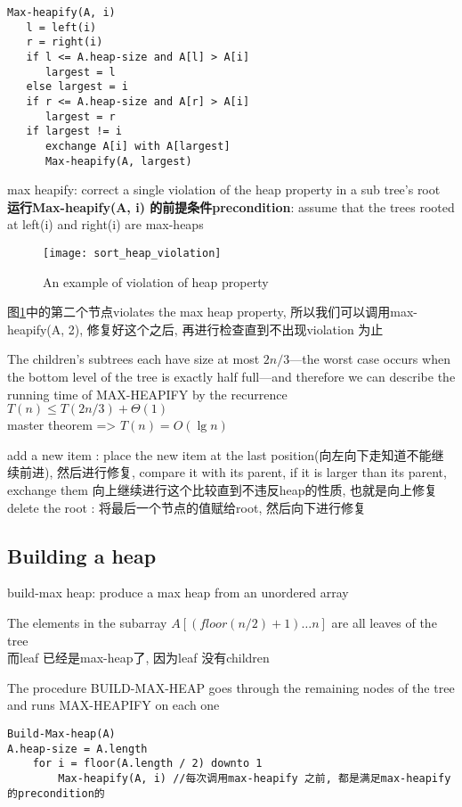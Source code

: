 \documentclass{article}
\begin{document}
\begin{verbatim}
Max-heapify(A, i)
   l = left(i)
   r = right(i)
   if l <= A.heap-size and A[l] > A[i]
      largest = l
   else largest = i
   if r <= A.heap-size and A[r] > A[i]
      largest = r
   if largest != i
      exchange A[i] with A[largest]
      Max-heapify(A, largest)
\end{verbatim}

max heapify: correct a single violation of the heap property in a sub tree's root\\
\textbf{运行Max-heapify(A, i) 的前提条件precondition}: assume that the trees rooted at left(i) and right(i) are max-heaps

\begin{figure}[htbp]
  \centering
  \texttt{[image: sort\_heap\_violation]}
  \caption{An example of violation of heap property}\label{fig.sort.heap.violation}
\end{figure}
图\ref{fig.sort.heap.violation}中的第二个节点violates the max heap property, 所以我们可以调用max-heapify(A, 2), 修复好这个之后, 再进行检查直到不出现violation 为止

The children's subtrees each have size at most $2n/3$—the worst case occurs when the bottom level of the tree is exactly half full—and therefore we can describe the running time of MAX-HEAPIFY by the recurrence\\
$T(n) \leq T(2n/3) +\Theta(1)$\\
master theorem => $T(n) = O(\lg n)$

add a new item : place the new item at the last position(向左向下走知道不能继续前进), 然后进行修复, compare it with its parent, if it is larger than its parent, exchange them 向上继续进行这个比较直到不违反heap的性质, 也就是向上修复\\
delete the root : 将最后一个节点的值赋给root, 然后向下进行修复

\subsection{Building a heap}
build-max heap: produce a max heap from an unordered array

The elements in the subarray $A[(floor(n/2)+ 1)…n]$ are all leaves of the tree\\
而leaf 已经是max-heap了, 因为leaf 没有children

The procedure BUILD-MAX-HEAP goes through the remaining nodes of the tree and runs MAX-HEAPIFY on each one
\begin{verbatim}
Build-Max-heap(A)
A.heap-size = A.length
    for i = floor(A.length / 2) downto 1
        Max-heapify(A, i) //每次调用max-heapify 之前, 都是满足max-heapify的precondition的
\end{verbatim}
\end{document}
